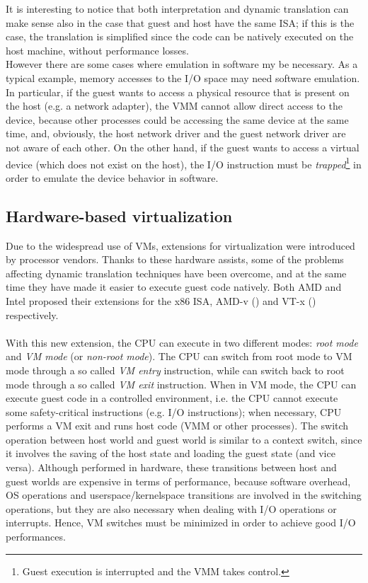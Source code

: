 \documentclass[a4paper, 12pt, titlepage]{report}
\begin{document}
It is interesting to notice that both interpretation and dynamic translation can make sense also in the case that guest and host have the same ISA; if this is the case, the translation is simplified since the code can be natively executed on the host machine, without performance losses.\\
However there are some cases where emulation in software my be necessary. As a typical example, memory accesses to the I/O space may need software emulation. In particular, if the guest wants to access a physical resource that is present on the host (e.g. a network adapter), the VMM cannot allow direct access to the device, because other processes could be accessing the same device at the same time, and, obviously, the host network driver and the guest network driver are not aware of each other. On the other hand, if the guest wants to access a virtual device (which does not exist on the host), the I/O instruction must be \textit{trapped}\footnote{Guest execution is interrupted and the VMM takes control.} in order to emulate the device behavior in software.

\subsection{Hardware-based virtualization} \label{subsec:hw_virt}
Due to the widespread use of VMs, extensions for virtualization were introduced by processor vendors. Thanks to these hardware assists, some of the problems affecting dynamic translation techniques have been overcome, and at the same time they have made it easier to execute guest code natively. Both AMD and Intel proposed their extensions for the x86 ISA, AMD-v (\cite{amd-v}) and VT-x (\cite{vt-x}) respectively.
\\
\\
With this new extension, the CPU can execute in two different modes: \textit{root mode} and \textit{VM mode} (or \textit{non-root mode}). The CPU can switch from root mode to VM mode through a so called \textit{VM entry} instruction, while can switch back to root mode through a so called \textit{VM exit} instruction. When in VM mode, the CPU can execute guest code in a controlled environment, i.e. the CPU cannot execute some safety-critical instructions (e.g. I/O instructions); when necessary, CPU performs a VM exit and runs host code (VMM or other processes). The switch operation between host world and guest world is similar to a context switch, since it involves the saving of the host state and loading the guest state (and vice versa). Although performed in hardware, these transitions between host and guest worlds are expensive in terms of performance, because software overhead, OS operations and userspace/kernelspace transitions are involved in the switching operations, but they are also necessary when dealing with I/O operations or interrupts. Hence, VM switches must be minimized in order to achieve good I/O performances.
\end{document}
